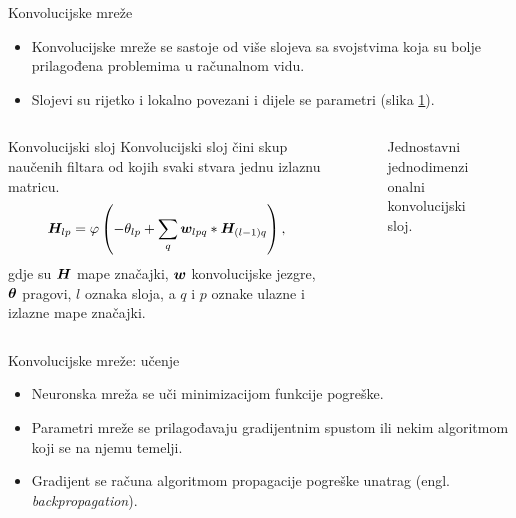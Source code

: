 \documentclass{beamer}
\newcommand{\ilustracija}[1]{}
\begin{document}
\begin{frame}{Konvolucijske mreže}
	\begin{itemize}
		\item Konvolucijske mreže se sastoje od više slojeva sa svojstvima koja su bolje prilagođena problemima u računalnom vidu.
		\item Slojevi su rijetko i lokalno povezani i dijele se parametri (slika \ref{fig:lok_pov}).
	\end{itemize}
	\begin{columns}[c]	
		\begin{column}{.673\textwidth}
			\begin{block}{Konvolucijski sloj}
				Konvolucijski sloj čini skup naučenih filtara od kojih svaki stvara jednu izlaznu matricu. 
				$$
				\bm{H}_{lp}=\varphi\left(
				-\theta_{lp} + \sum_q \bm{w}_{lpq}\ast\bm{H}_{(l-1)q}\right),
				$$
				gdje su $\bm{H}$ mape značajki, $\bm{w}$ konvolucijske jezgre, $\bm{\theta}$ pragovi, $l$ oznaka sloja, a $q$ i $p$ oznake ulazne i izlazne mape značajki.
			\end{block}
		\end{column}
		\begin{column}{.273\textwidth}
			\begin{figure}[ht] \centering
				\scalebox{0.8}{\ilustracija{konv-sloj}}
				\caption{Jednostavni jednodimenzionalni konvolucijski sloj.}
				\label{fig:lok_pov}
			\end{figure}
		\end{column}
	\end{columns}
\end{frame}

\begin{frame}{Konvolucijske mreže: učenje}
	\begin{itemize}
		\item Neuronska mreža se uči minimizacijom funkcije pogreške.
		\item Parametri mreže se prilagođavaju gradijentnim spustom ili nekim algoritmom koji se na njemu temelji.
		\item Gradijent se računa algoritmom propagacije pogreške unatrag (engl. \emph{backpropagation}).
	\end{itemize}
\end{frame}
\end{document}
